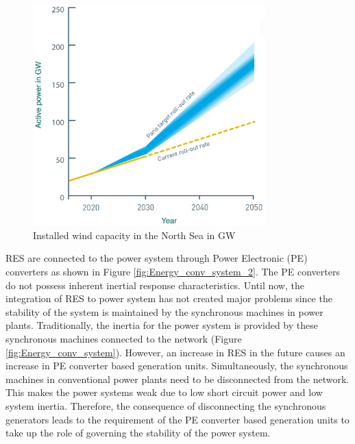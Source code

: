 \begin{figure}[H]
\centering
    \includegraphics[height = 8.5cm,width = 9cm]{Diagrams/Chapter_1/Paris.pdf}
    \caption{Installed wind capacity in the North Sea in GW \cite{noauthor_vision_2020}}
    \label{fig:Paris_roll_out}
\end{figure}

\gls{RES} are connected to the power system through Power Electronic (\gls{PE}) converters as shown in Figure \ref{fig:Energy_conv_system_2}. The \gls{PE} converters do not possess inherent inertial response characteristics. Until now, the integration of \gls{RES} to power system has not created major problems since the stability of the system is maintained by the synchronous machines in power plants. Traditionally, the inertia for the power system is provided by these synchronous machines connected to the network (Figure \ref{fig:Energy_conv_system}). However, an increase in \gls{RES} in the future causes an increase in \gls{PE} converter based generation units. Simultaneously, the synchronous machines in conventional power plants need to be disconnected from the network. This makes the power systems weak due to low short circuit power and low system inertia. Therefore, the consequence of disconnecting the synchronous generators leads to the requirement of the \gls{PE} converter based generation units to take up the role of governing the stability of the power system.

